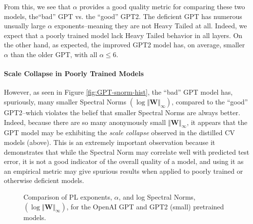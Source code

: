 From this, we see that $\alpha$ provides a good quality metric for comparing these two models, the``bad'' GPT vs. the ``good'' GPT2.
The deficient GPT has numerous unsually large $\alpha$ exponents--meaning they are not Heavy Tailed at all.
Indeed, we expect that a poorly trained model lack Heavy Tailed behavior in all layers.
On the other hand, as expected, the improved GPT2 model has, on average, smaller $\alpha$ than the older GPT, with all $\alpha\le6$.  


\paragraph{Scale Collapse in Poorly Trained Models}
However, as seen in Figure \ref{fig:GPT-snorm-hist},
the ``bad'' GPT model has, spuriously, many smaller Spectral Norms $(\log\Vert\mathbf{W}\Vert_{\infty})$,
compared to the ``good'' GPT2--which violates the belief that smaller Spectral Norms are always better.
Indeed, because there are so many anonymously small $\Vert\mathbf{W}\Vert_{\infty}$,
it appears that the GPT model may be exhibiting the \emph{scale collapse} observed
in the distilled CV models (above).
This is an extremely important observation because it demonstrates that while the Spectral Norm
may correlate well with predicted test error, it is not a good indicator of the overall quality of a model,
and using it as an empirical metric may give spurious results when applied to poorly trained
or otherwise deficient models. 

\begin{figure}[h]
    \centering
   \caption{Comparison of PL exponents, $\alpha$, and log Spectral Norms, 
$(\log\Vert\mathbf{W}\Vert_{\infty})$, for the OpenAI GPT and GPT2 (small) pretrained models.}
   
\label{fig:GPT-hist}
\end{figure}





